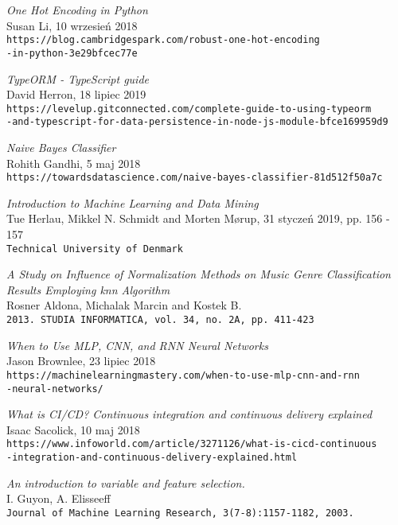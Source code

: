 \begin{thebibliography}{20}
\textit{One Hot Encoding in Python}
\\Susan Li, 10 wrzesień 2018
\\\texttt{https://blog.cambridgespark.com/robust-one-hot-encoding\\-in-python-3e29bfcec77e}

\textit{TypeORM - TypeScript guide}
\\David Herron, 18 lipiec 2019
\\\texttt{https://levelup.gitconnected.com/complete-guide-to-using-typeorm\\-and-typescript-for-data-persistence-in-node-js-module-bfce169959d9}

\textit{Naive Bayes Classifier}
\\Rohith Gandhi, 5 maj 2018
\\\texttt{https://towardsdatascience.com/naive-bayes-classifier-81d512f50a7c}

\textit{Introduction to Machine Learning and Data Mining}
\\Tue Herlau, Mikkel N. Schmidt and Morten Mørup, 31 styczeń 2019, pp. 156 - 157
\\\texttt{Technical University of Denmark}


\textit{A Study on Influence of Normalization Methods on Music Genre Classification Results Employing knn Algorithm}
\\Rosner Aldona, Michalak Marcin and Kostek B.
\\\texttt{2013. STUDIA INFORMATICA, vol. 34, no. 2A, pp. 411-423}

\textit{When to Use MLP, CNN, and RNN Neural Networks}
\\Jason Brownlee, 23 lipiec 2018
\\\texttt{https://machinelearningmastery.com/when-to-use-mlp-cnn-and-rnn\\-neural-networks/}

\textit{What is CI/CD? Continuous integration and continuous delivery explained}
\\Isaac Sacolick, 10 maj 2018
\\\texttt{https://www.infoworld.com/article/3271126/what-is-cicd-continuous\\-integration-and-continuous-delivery-explained.html}

\textit{An introduction to variable and feature selection.}
\\I. Guyon, A. Elisseeff
\\\texttt{Journal of Machine Learning Research, 3(7-8):1157-1182, 2003.}


\end{thebibliography}
